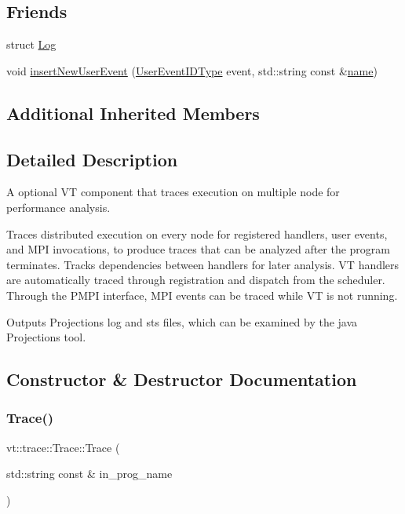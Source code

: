 \subsection*{Friends}
\begin{DoxyCompactItemize}
\item 
struct \hyperlink{structvt_1_1trace_1_1_trace_add132ae9df1b7ef820c8082c32b0f839}{Log}
\item 
void \hyperlink{structvt_1_1trace_1_1_trace_a17caa1eeb27fd6a4af8786a7f0679d77}{insert\+New\+User\+Event} (\hyperlink{namespacevt_1_1trace_a5908920d051c144c89f17c69ed262350}{User\+Event\+I\+D\+Type} event, std\+::string const \&\hyperlink{structvt_1_1trace_1_1_trace_aaae4bbf6d009229a5c8b9db67a127942}{name})
\end{DoxyCompactItemize}
\subsection*{Additional Inherited Members}


\subsection{Detailed Description}
A optional VT component that traces execution on multiple node for performance analysis. 

Traces distributed execution on every node for registered handlers, user events, and M\+PI invocations, to produce traces that can be analyzed after the program terminates. Tracks dependencies between handlers for later analysis. VT handlers are automatically traced through registration and dispatch from the scheduler. Through the P\+M\+PI interface, M\+PI events can be traced while VT is not running.

Outputs Projections log and sts files, which can be examined by the java Projections tool. 

\subsection{Constructor \& Destructor Documentation}
\mbox{\label{structvt_1_1trace_1_1_trace_a2b736f560ee446cbd84aaf96e25c8d0b}} 
\subsubsection{\texorpdfstring{Trace()}{Trace()}}
{\footnotesize\ttfamily vt\+::trace\+::\+Trace\+::\+Trace (\begin{DoxyParamCaption}\item[{std\+::string const \&}]{in\+\_\+prog\+\_\+name }\end{DoxyParamCaption})}



